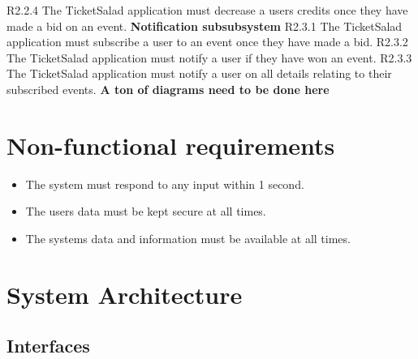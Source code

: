 \documentclass[11pt]{article}
\begin{document}
	R2.2.4 The TicketSalad application must decrease a users credits once they have made a bid on an event.
	\newline
	\newline
	\textbf{Notification subsubsystem}
	\newline
	R2.3.1 The TicketSalad application must subscribe a user to an event once they have made a bid.
	\newline
	R2.3.2 The TicketSalad application must notify a user if they have won an event.
	\newline
	R2.3.3 The TicketSalad application must notify a user on all details relating to their subscribed events.
	\newline
	\textbf{A ton of diagrams need to be done here}	
	\section{Non-functional requirements}
	\begin{itemize}
		\item The system must respond to any input within 1 second.
		\item The users data must be kept secure at all times.
		\item The systems data and information must be available at all times.
	\end{itemize}

	\section{System Architecture}
	\subsection{Interfaces}
\end{document}

